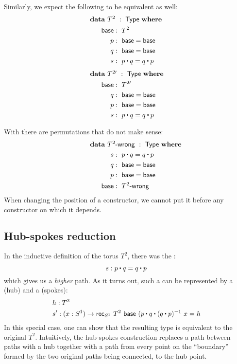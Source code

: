 \documentclass[a4paper,10pt]{report}
\begin{document}
Similarly, we expect the following to be equivalent as well:
%
\begin{alignat*}{2}
  &\rlap{$\data\ T^2\ :\ \Type\ \where$} \\
  &&\ \ \base     &:\ T^2 \\
  &&\ \ p         &:\ \base = \base \\
  &&\ \ q         &:\ \base = \base \\
  &&\ \ s         &:\ p \ct q = q \ct p
\end{alignat*}
%
\begin{alignat*}{2}
  &\rlap{$\data\ T^{2\prime}\ :\ \Type\ \where$} \\
  &&\ \ \base     &:\ T^{2\prime} \\
  &&\ \ q         &:\ \base = \base \\
  &&\ \ p         &:\ \base = \base \\
  &&\ \ s         &:\ p \ct q = q \ct p
\end{alignat*}

With \hits there are permutations that do not make sense:
\begin{alignat*}{2}
  &\rlap{$\data\ \toruswrong\ :\ \Type\ \where$} \\
  &&\ \ s         &:\ p \ct q = q \ct p \\
  &&\ \ q         &:\ \base = \base \\
  &&\ \ p         &:\ \base = \base \\
  &&\ \ \base     &:\ \toruswrong
\end{alignat*}
When changing the position of a constructor, we cannot put it before
any constructor on which it depends.

\subsection{Hub-spokes reduction}

In the inductive definition of the torus $T^2$, there was the \twoconstructor:
$$
s : p \ct q = q \ct p
$$
which gives us a \emph{higher} path. As it turns out, such a
\twoconstructor can be represented by a \zeroconstructor (hub)
and a \oneconstructor (spokes):
%
\begin{align*}
&h : T^2 \\
&s' : (x : S^1) \to \rec_{S^1}\ T^2\ \base\ (p \ct q \ct (q \ct p)^{-1}\ x = h
\end{align*}
%
In this special case, one can show that the resulting type is
equivalent to the original $T^2$. Intuitively, the hub-spokes
construction replaces a path between paths with a hub together with a
path from every point on the ``boundary'' formed by the two original
paths being connected, to the hub point.
\end{document}
